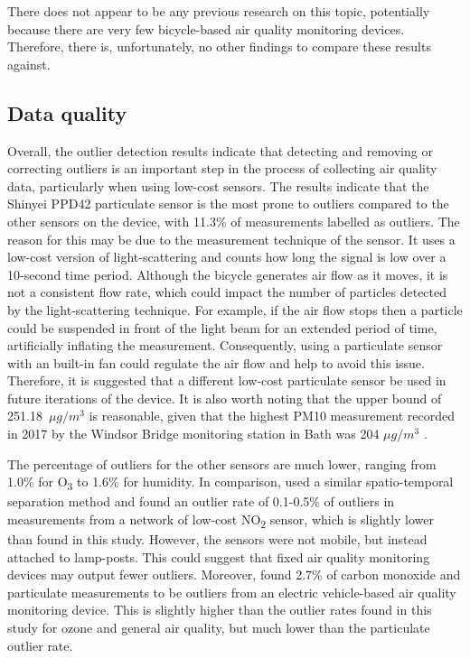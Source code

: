 \documentclass[11pt,twosided,a4paper]{report}
\begin{document}
There does not appear to be any previous research on this topic, potentially because there are very few bicycle-based air quality monitoring devices. Therefore, there is, unfortunately, no other findings to compare these results against.

\subsection{Data quality}

Overall, the outlier detection results indicate that detecting and removing or correcting outliers is an important step in the process of collecting air quality data, particularly when using low-cost sensors. The results indicate that the Shinyei PPD42 particulate sensor is the most prone to outliers compared to the other sensors on the device, with 11.3\% of measurements labelled as outliers. The reason for this may be due to the measurement technique of the sensor. It uses a low-cost version of light-scattering and counts how long the signal is low over a 10-second time period. Although the bicycle generates air flow as it moves, it is not a consistent flow rate, which could impact the number of particles detected by the light-scattering technique. For example, if the air flow stops then a particle could be suspended in front of the light beam for an extended period of time, artificially inflating the measurement. Consequently, using a particulate sensor with an built-in fan could regulate the air flow and help to avoid this issue. Therefore, it is suggested that a different low-cost particulate sensor be used in future iterations of the device. It is also worth noting that the upper bound of 251.18~$\mu g/m^3$ is reasonable, given that the highest PM10 measurement recorded in 2017 by the Windsor Bridge monitoring station in Bath was 204 $\mu g/m^3$ \citep{courthold2018max}.

The percentage of outliers for the other sensors are much lower, ranging from 1.0\% for O\textsubscript{3} to 1.6\% for humidity. In comparison, \cite{vanZoest2018outlierdetection} used a similar spatio-temporal separation method and found an outlier rate of 0.1-0.5\% of outliers in measurements from a network of low-cost NO\textsubscript{2} sensor, which is slightly lower than found in this study. However, the sensors were not mobile, but instead attached to lamp-posts. This could suggest that fixed air quality monitoring devices may output fewer outliers. Moreover, \cite{Hagler2010durhamallelectric} found 2.7\% of carbon monoxide and particulate measurements to be outliers from an electric vehicle-based air quality monitoring device. This is slightly higher than the outlier rates found in this study for ozone and general air quality, but much lower than the particulate outlier rate.
\end{document}
